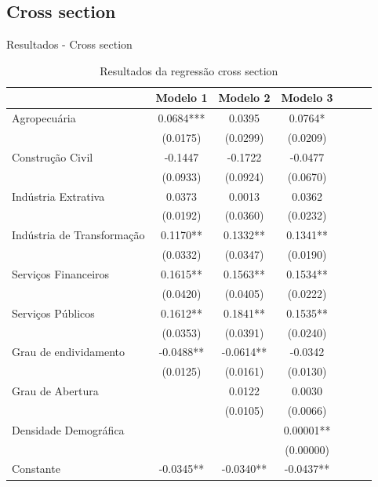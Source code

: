 \documentclass[aspectratio=169, 10pt]{beamer}
\begin{document}
\subsection{Cross section}
\begin{frame}{Resultados - Cross section}
\tiny
\vspace{-1.75em}
\begin{center}
\begin{table}[htb!]
\caption{Resultados da regressão cross section}
\label{table:cross_section_results}
\vspace{-0.5em}
\tiny
\begin{tabular}{l c c c c c c
    }
  \hline
& Modelo 1 & Modelo 2 & Modelo 3 \\
  \hline
Agropecuária & 0.0684*** & 0.0395 & 0.0764* \\
 & (0.0175) & (0.0299) & (0.0209) \\
Construção Civil & -0.1447 & -0.1722 & -0.0477 \\
 & (0.0933) & (0.0924) & (0.0670) \\
Indústria Extrativa & 0.0373 & 0.0013 & 0.0362 \\
 & (0.0192) & (0.0360) & (0.0232) \\
Indústria de Transformação & 0.1170** & 0.1332** & 0.1341** \\
 & (0.0332) & (0.0347) & (0.0190) \\
Serviços Financeiros & 0.1615** & 0.1563** & 0.1534** \\
 & (0.0420) & (0.0405) & (0.0222) \\
Serviços Públicos & 0.1612** & 0.1841** & 0.1535** \\
 & (0.0353) & (0.0391) & (0.0240) \\
Grau de endividamento & -0.0488** & -0.0614** & -0.0342 \\
 & (0.0125) & (0.0161) & (0.0130) \\
Grau de Abertura &  & 0.0122 & 0.0030 \\
 &  & (0.0105) & (0.0066) \\ 
Densidade Demográfica &  &  & 0.00001** \\
 &  &  & (0.00000) \\
Constante & -0.0345** & -0.0340** & -0.0437** \\

\end{tabular}
\end{table}
\end{center}
\end{frame}
\end{document}
